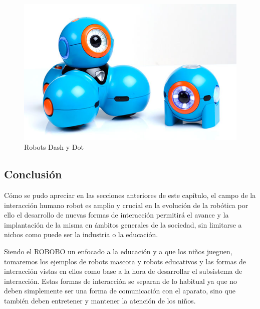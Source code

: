    \begin{figure}
	\centering
	\includegraphics[width=0.6\linewidth]{imagenes/dashanddot.jpg}
	\caption{Robots Dash y Dot}
	\label{fig:dashanddot}
\end{figure} 
 
 
 \subsection{Conclusión}
   
Cómo se pudo apreciar en las secciones anteriores de este capítulo, el campo de la interacción humano robot es amplio y crucial en la evolución de la robótica por ello el desarrollo de nuevas formas de interacción permitirá el avance y la implantación de la misma en ámbitos generales de la sociedad, sin limitarse a nichos como puede ser la industria o la educación.

Siendo el ROBOBO un enfocado a la educación y a que los niños jueguen, tomaremos los  ejemplos de robots mascota y robots educativos y las formas de interacción vistas en ellos como base a la hora de desarrollar el subsistema de interacción. Estas formas de interacción se separan de lo habitual ya que no deben simplemente ser una forma de comunicación con el aparato, sino que también deben entretener y mantener la atención de los niños.



 

   
